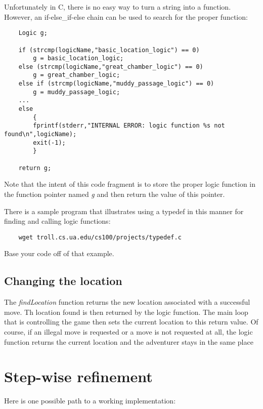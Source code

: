\documentclass[12pt]{article}
\begin{document}
Unfortunately in C, there is no easy way to turn a string into
a function. However, an if-else\_if-else chain
can be used to search for the proper function:

\begin{verbatim}
    Logic g;

    if (strcmp(logicName,"basic_location_logic") == 0)
        g = basic_location_logic;
    else (strcmp(logicName,"great_chamber_logic") == 0)
        g = great_chamber_logic;
    else if (strcmp(logicName,"muddy_passage_logic") == 0)
        g = muddy_passage_logic;
    ...
    else
        {
        fprintf(stderr,"INTERNAL ERROR: logic function %s not found\n",logicName);
        exit(-1);
        }

    return g;
\end{verbatim}

Note that the intent of this code
fragment is to store the proper logic function 
in the function pointer named {\it g} and then return the value
of this pointer.

There is a sample program that illustrates using a typedef in this
manner for finding and calling logic functions:

\begin{verbatim}
    wget troll.cs.ua.edu/cs100/projects/typedef.c
\end{verbatim}

Base your code off of that example.

\subsection*{Changing the location}

The {\it findLocation} function returns the new location associated
with a successful
move. Th location found is then returned by the logic function.
The main loop that is controlling the game then sets the current
location to this return value. Of course, if an illegal move is
requested or a move is not requested at all, the logic function
returns the current location and the adventurer stays in the same place

\section*{Step-wise refinement}

Here is one possible path to a working implementation:
\end{document}
